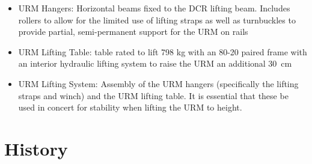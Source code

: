 \documentclass[11pt]{article}
\begin{document}
\begin{itemize}
\item URM Hangers: Horizontal beams fixed to the DCR lifting beam. Includes rollers to allow for the limited use of lifting straps as well as turnbuckles to provide partial, semi-permanent support for the URM on rails
\item URM Lifting Table: table rated to lift 798 kg with an 80-20 paired frame with an interior hydraulic lifting system to raise the URM an additional 30~cm
\item URM Lifting System: Assembly of the URM hangers (specifically the lifting straps and winch) and the URM lifting table. It is essential that these be used in concert for stability when lifting the URM to height. 
\end{itemize}

\section{History}
\end{document}
